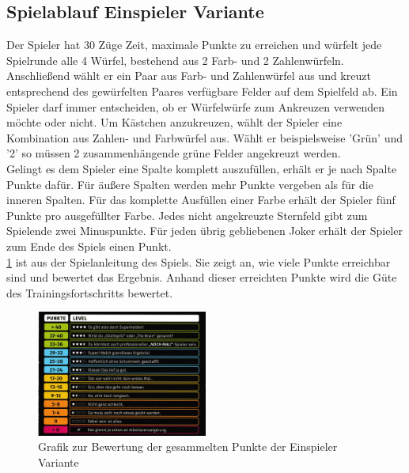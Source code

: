 \subsection{Spielablauf Einspieler Variante}
Der Spieler hat 30 Züge Zeit, maximale Punkte zu erreichen und würfelt jede Spielrunde alle 4 Würfel, bestehend aus 2 Farb- und 2 Zahlenwürfeln. Anschließend wählt er ein Paar aus Farb- und Zahlenwürfel aus und kreuzt entsprechend des gewürfelten Paares verfügbare Felder auf dem Spielfeld ab.
Ein Spieler darf immer entscheiden, ob er Würfelwürfe zum Ankreuzen verwenden möchte oder nicht.
Um Kästchen anzukreuzen, wählt der Spieler eine Kombination aus Zahlen- und Farbwürfel aus. Wählt er beispielsweise 'Grün' und '2' so müssen 2 zusammenhängende grüne Felder angekreuzt werden. \\
Gelingt es dem  Spieler eine Spalte komplett auszufüllen, erhält er je nach Spalte Punkte dafür. Für äußere Spalten werden mehr Punkte vergeben als für die inneren Spalten.
Für das komplette Ausfüllen einer Farbe erhält der Spieler fünf Punkte pro ausgefüllter Farbe.
Jedes nicht angekreuzte Sternfeld gibt zum Spielende zwei Minuspunkte.
Für jeden übrig gebliebenen Joker erhält der Spieler zum Ende des Spiels einen Punkt.\\
\ref{fig:Punkteübersicht} ist aus der Spielanleitung des Spiels. Sie zeigt an, wie viele Punkte erreichbar sind und bewertet das Ergebnis. Anhand dieser erreichten Punkte wird die Güte des Trainingsfortschritts bewertet.

\begin{figure}[!h]
	\centering
	\includegraphics[width=0.5\textwidth]{Bilder/Punkte.jpeg}
	\caption{Grafik zur Bewertung der gesammelten Punkte der Einspieler Variante 
	\cite{schmidt_spiele_gmbh_spielregeln_nodate}}
	\label{fig:Punkteübersicht}
\end{figure}













